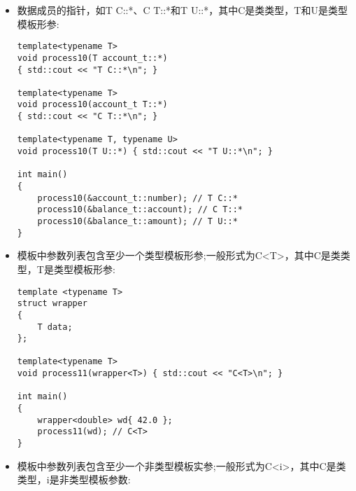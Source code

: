 \begin{itemize}
\begin{lstlisting}[style=styleCXX]
template<typename T>
void process09(balance_report_t(balance_t::*)(T))
{ std::cout << "D (C::*)(T)\n"; }

int main()
{
	int (account_t::* pfm1)() = &account_t::get_number;
	int (account_t::* pfm2)(std::string) =
		&account_t::from_string;
	int (balance_t::* pfm3)() =
		&balance_t::get_account_number;
	bool (balance_t::* pfm4)(double) =
		&balance_t::can_withdraw;
	account_t (balance_t::* pfm5)() =
		&balance_t::get_account;
	transaction_t(balance_t::* pfm6)(double) =
		&balance_t::withdraw;
	balance_report_t(balance_t::* pfm7)(int) =
		&balance_t::make_report;
		
	process09(pfm1); // T (C::*)()
	process09(pfm2); // T (C::*)(U)
	process09(pfm3); // T (U::*)()
	process09(pfm4); // T (U::*)(V)
	process09(pfm5); // C (T::*)()
	process09(pfm6); // C (T::*)(U)
	process09(pfm7); // D (C::*)(T)
}
\end{lstlisting}

\item
数据成员的指针，如T C::*、C T::*和T U::*，其中C是类类型，T和U是类型模板形参:

\begin{lstlisting}[style=styleCXX]
template<typename T>
void process10(T account_t::*)
{ std::cout << "T C::*\n"; }

template<typename T>
void process10(account_t T::*)
{ std::cout << "C T::*\n"; }

template<typename T, typename U>
void process10(T U::*) { std::cout << "T U::*\n"; }

int main()
{
	process10(&account_t::number); // T C::*
	process10(&balance_t::account); // C T::*
	process10(&balance_t::amount); // T U::*
}
\end{lstlisting}

\item
模板中参数列表包含至少一个类型模板形参;一般形式为C<T>，其中C是类类型，T是类型模板形参:

\begin{lstlisting}[style=styleCXX]
template <typename T>
struct wrapper
{
	T data;
};

template<typename T>
void process11(wrapper<T>) { std::cout << "C<T>\n"; }

int main()
{
	wrapper<double> wd{ 42.0 };
	process11(wd); // C<T>
}
\end{lstlisting}

\item
模板中参数列表包含至少一个非类型模板实参;一般形式为C<i>，其中C是类类型，i是非类型模板参数:


\end{itemize}
